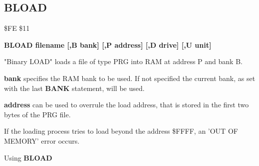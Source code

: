 
\newpage
\subsection{BLOAD}
\begin{description}[leftmargin=3cm,style=nextline]
\item [Token:] \$FE \$11
\item [Format:] {\bf BLOAD filename [,B bank]
                [,P address]  [,D drive] [,U unit] }
\item [Usage:]
   "Binary LOAD" loads a file of type
   PRG into RAM at address P and bank B.

   \filenamedefinition

   {\bf bank} specifies the RAM bank to be used.
   If not specified the current bank, as set with the last
   {\bf BANK} statement, will be used.

   {\bf address} can be used to overrule the load address,
   that is stored in the first two bytes of the PRG file.

   \drivedefinition

   \unitdefinition

\item [Remarks:]
   If the loading process tries to load beyond the address \$FFFF,
   an 'OUT OF MEMORY' error occurs.

\item [Example:] Using {\bf BLOAD}
\end{description}


\newpage
